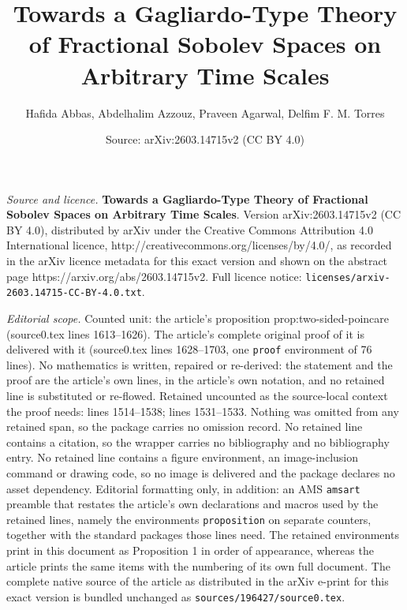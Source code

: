 \documentclass[10pt,a4paper]{amsart}
\title{\textbf{Towards a Gagliardo-Type Theory of Fractional Sobolev Spaces on Arbitrary Time Scales}}
\author{Hafida Abbas, Abdelhalim Azzouz, Praveen Agarwal, Delfim F. M. Torres}
\date{Source: arXiv:2603.14715v2 (CC BY 4.0)}
\begin{document}
\maketitle

\noindent\emph{Source and licence.} \textbf{Towards a Gagliardo-Type Theory of Fractional Sobolev Spaces on Arbitrary Time Scales}. Version arXiv:2603.14715v2 (CC BY 4.0), distributed by arXiv under the Creative Commons Attribution 4.0 International licence, http://creativecommons.org/licenses/by/4.0/, as recorded in the arXiv licence metadata for this exact version and shown on the abstract page https://arxiv.org/abs/2603.14715v2. Full licence notice: \texttt{licenses/arxiv-2603.14715-CC-BY-4.0.txt}.\par\smallskip

\noindent\textit{Editorial scope.} Counted unit: the article's proposition prop:two-sided-poincare (source0.tex lines 1613--1626). The article's complete original proof of it is delivered with it (source0.tex lines 1628--1703, one \texttt{proof} environment of 76 lines). No mathematics is written, repaired or re-derived: the statement and the proof are the article's own lines, in the article's own notation, and no retained line is substituted or re-flowed.  Retained uncounted as the source-local context the proof needs: lines 1514--1538; lines 1531--1533.  Nothing was omitted from any retained span, so the package carries no omission record.  No retained line contains a citation, so the wrapper carries no bibliography and no bibliography entry.  No retained line contains a figure environment, an image-inclusion command or drawing code, so no image is delivered and the package declares no asset dependency.  Editorial formatting only, in addition: an AMS \texttt{amsart} preamble that restates the article's own declarations and macros used by the retained lines, namely the environments \texttt{proposition} on separate counters, together with the standard packages those lines need.  The retained environments print in this document as Proposition 1 in order of appearance, whereas the article prints the same items with the numbering of its own full document.  The complete native source of the article as distributed in the arXiv e-print for this exact version is bundled unchanged as \texttt{sources/196427/source0.tex}.
\end{document}
